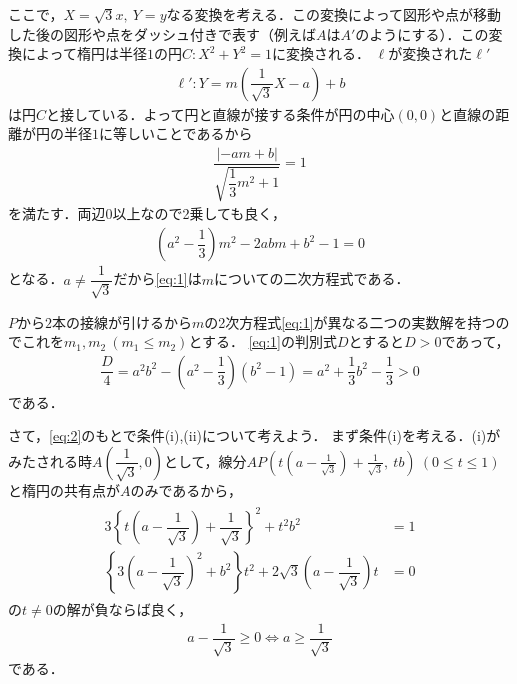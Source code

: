 \documentclass[../../main.tex]{subfiles}
\begin{document}
ここで，$X=\sqrt{3}x,\ Y=y$なる変換を考える．この変換によって図形や点が移動した後の図形や点をダッシュ付きで表す（例えば$A$は$A'$のようにする）．この変換によって楕円は半径$1$の円$C: X^2+Y^2=1$に変換される．
$\ell$が変換された$\ell'$
\begin{align}
  \ell': Y=m\left(\dfrac{1}{\sqrt{3}}X-a\right)+b
\end{align}
は円$C$と接している．よって円と直線が接する条件が円の中心$(0,0)$と直線の距離が円の半径$1$に等しいことであるから
\begin{align}
  \dfrac{|-am+b|}{\sqrt{\dfrac{1}{3}m^2+1}}=1
\end{align}
を満たす．両辺$0$以上なので2乗しても良く，
\begin{align}
  \left(a^2-\dfrac{1}{3}\right)m^2-2abm+b^2-1=0 \label{eq:1}
\end{align}
となる．$a\ne\dfrac{1}{\sqrt{3}}$だから\cref{eq:1}は$m$についての二次方程式である．

$P$から$2$本の接線が引けるから$m$の2次方程式\cref{eq:1}が異なる二つの実数解を持つのでこれを$m_1,m_2\ (m_1\le m_2)$とする．
\cref{eq:1}の判別式$D$とすると$D > 0$であって，
\begin{align}
  \dfrac{D}{4}=a^2b^2-\left(a^2-\dfrac{1}{3}\right)(b^2-1)=a^2+\dfrac{1}{3}b^2-\dfrac{1}{3} > 0 \label{eq:2}
\end{align}
である．

さて，\cref{eq:2}のもとで条件(i),(ii)について考えよう．
まず条件(i)を考える．(i)がみたされる時$A\left(\dfrac{1}{\sqrt{3}},0\right)$として，線分$AP\left(t\left(a-\tfrac{1}{\sqrt{3}}\right)+\tfrac{1}{\sqrt{3}},\ tb\right)\ (0\le t\le1)$と楕円の共有点が$A$のみであるから，
\begin{align}
  \begin{split}
    3\left\{t\left(a-\dfrac{1}{\sqrt{3}}\right)+\dfrac{1}{\sqrt{3}}\right\}^2+t^2b^2&=1 \\
    \left\{3\left(a-\dfrac{1}{\sqrt{3}}\right)^2+b^2\right\}t^2+2\sqrt{3}\left(a-\dfrac{1}{\sqrt{3}}\right)t&=0
  \end{split}
\end{align}
の$t\ne0$の解が負ならば良く，
\begin{align}
  a-\dfrac{1}{\sqrt{3}}\ge0 \iff a\ge\dfrac{1}{\sqrt{3}} \label{eq:3}
\end{align}
である．
\end{document}
